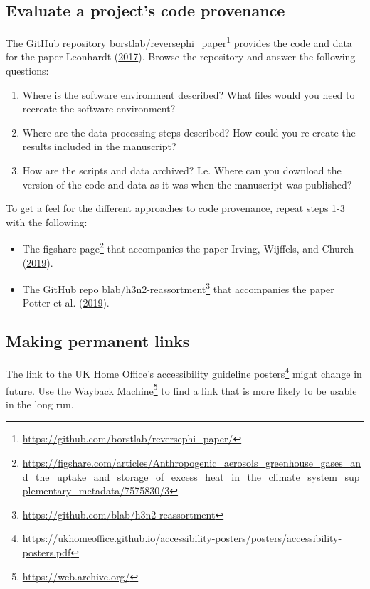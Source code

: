 \documentclass[
]{krantz}
\providecommand{\tightlist}{%
  \setlength{\itemsep}{0pt}\setlength{\parskip}{0pt}}
\renewcommand{\href}[2]{#2\footnote{\url{#1}}}
\begin{document}
\hypertarget{provenance-ex-eval-code}{%
\subsection{Evaluate a project's code provenance}\label{provenance-ex-eval-code}}

The GitHub repository \href{https://github.com/borstlab/reversephi_paper/}{borstlab/reversephi\_paper} provides the code and data for the paper Leonhardt (\protect\hyperlink{ref-Leon2017}{2017}).
Browse the repository and answer the following questions:

\begin{enumerate}
\def\labelenumi{\arabic{enumi}.}
\tightlist
\item
  Where is the software environment described? What files would you need to recreate the software environment?
\item
  Where are the data processing steps described? How could you re-create the results included in the manuscript?
\item
  How are the scripts and data archived?
  I.e. Where can you download the version of the code and data as it was when the manuscript was published?
\end{enumerate}

To get a feel for the different approaches to code provenance, repeat steps 1-3 with the following:

\begin{itemize}
\item
  \href{https://figshare.com/articles/Anthropogenic_aerosols_greenhouse_gases_and_the_uptake_and_storage_of_excess_heat_in_the_climate_system_supplementary_metadata/7575830/3}{The figshare page} that accompanies the paper Irving, Wijffels, and Church (\protect\hyperlink{ref-Irving2019}{2019}).
\item
  The GitHub repo \href{https://github.com/blab/h3n2-reassortment}{blab/h3n2-reassortment} that accompanies the paper Potter et al. (\protect\hyperlink{ref-Potter2019}{2019}).
\end{itemize}

\hypertarget{provenance-ex-permanent-links}{%
\subsection{Making permanent links}\label{provenance-ex-permanent-links}}

The link to the UK Home Office's \href{https://ukhomeoffice.github.io/accessibility-posters/posters/accessibility-posters.pdf}{accessibility guideline posters} might change in future.
Use the \href{https://web.archive.org/}{Wayback Machine} to find a link that is more likely to be usable in the long run.
\end{document}
